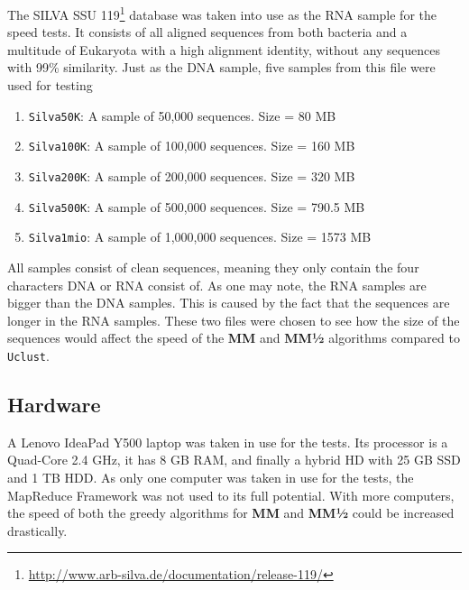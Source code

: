 \documentclass[../../main.tex]{subfiles}
\begin{document}
The SILVA SSU 119\footnote{\url{http://www.arb-silva.de/documentation/release-119/}} database was taken into use as the RNA sample for the speed tests. It consists of all aligned sequences from both bacteria and a multitude of Eukaryota with a high alignment identity, without any sequences with 99\% similarity. Just as the DNA sample, five samples from this file were used for testing
\begin{enumerate}
\item \texttt{Silva50K}: A sample of 50,000 sequences. Size = 80 MB
\item \texttt{Silva100K}: A sample of 100,000 sequences. Size = 160 MB
\item \texttt{Silva200K}: A sample of 200,000 sequences. Size = 320 MB
\item \texttt{Silva500K}: A sample of 500,000 sequences. Size = 790.5 MB
\item \texttt{Silva1mio}: A sample of 1,000,000 sequences. Size = 1573 MB
\end{enumerate}

All samples consist of clean sequences, meaning they only contain the four characters DNA or RNA consist of. As one may note, the RNA samples are bigger than the DNA samples. This is caused by the fact that the sequences are longer in the RNA samples. These two files were chosen to see how the size of the sequences would affect the speed of the {\bf MM} and {\bf MM½} algorithms compared to \texttt{Uclust}.

\subsection{Hardware}
A Lenovo IdeaPad Y500 laptop was taken in use for the tests. Its processor is a Quad-Core 2.4 GHz, it has 8 GB RAM, and finally a hybrid HD with 25 GB SSD and 1 TB HDD. As only one computer was taken in use for the tests, the MapReduce Framework was not used to its full potential. With more computers, the speed of both the greedy algorithms for {\bf MM} and {\bf MM½} could be increased drastically. 
\end{document}
